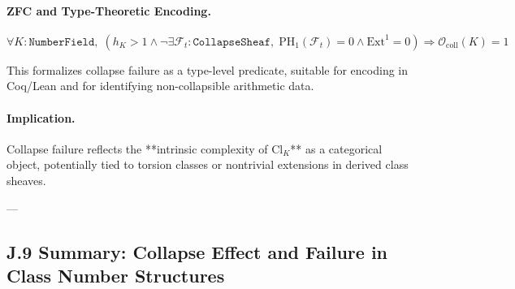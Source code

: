 \documentclass[11pt]{article}
\begin{document}
\paragraph{ZFC and Type-Theoretic Encoding.}

\[
\forall K : \texttt{NumberField},\;
(h_K > 1 \wedge \neg \exists \mathcal{F}_t : \texttt{CollapseSheaf},\;
\mathrm{PH}_1(\mathcal{F}_t) = 0 \wedge \mathrm{Ext}^1 = 0)
\Rightarrow \mathcal{O}_{\mathrm{coll}}(K) = 1
\]

This formalizes collapse failure as a type-level predicate, suitable for encoding in Coq/Lean and for identifying non-collapsible arithmetic data.

\paragraph{Implication.}
Collapse failure reflects the **intrinsic complexity of \( \mathrm{Cl}_K \)** as a categorical object, potentially tied to torsion classes or nontrivial extensions in derived class sheaves.

---

\subsection*{J.9 Summary: Collapse Effect and Failure in Class Number Structures}
\end{document}
